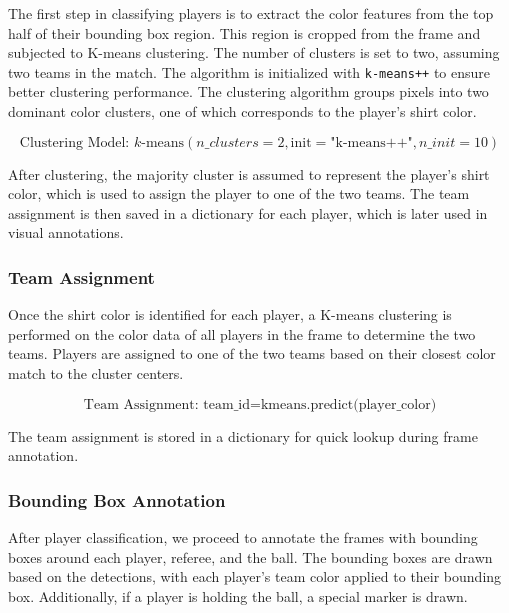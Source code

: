 The first step in classifying players is to extract the color features from the top half of their bounding box region. This region is cropped from the frame and subjected to K-means clustering. The number of clusters is set to two, assuming two teams in the match. The algorithm is initialized with \texttt{k-means++} to ensure better clustering performance. The clustering algorithm groups pixels into two dominant color clusters, one of which corresponds to the player's shirt color.


\begin{equation}
    \text{Clustering Model: } k\text{-means}(n\_clusters=2, \text{init}=\text{"k-means++"}, n\_init=10)
\end{equation}

After clustering, the majority cluster is assumed to represent the player's shirt color, which is used to assign the player to one of the two teams. The team assignment is then saved in a dictionary for each player, which is later used in visual annotations.

\subsubsection{Team Assignment}

Once the shirt color is identified for each player, a K-means clustering is performed on the color data of all players in the frame to determine the two teams. Players are assigned to one of the two teams based on their closest color match to the cluster centers.

\begin{equation}
\text{Team Assignment: } \text{team\_id} = \text{kmeans.predict(player\_color)}
\end{equation}

The team assignment is stored in a dictionary for quick lookup during frame annotation.

\subsubsection{Bounding Box Annotation}

After player classification, we proceed to annotate the frames with bounding boxes around each player, referee, and the ball. The bounding boxes are drawn based on the detections, with each player’s team color applied to their bounding box. Additionally, if a player is holding the ball, a special marker is drawn.

